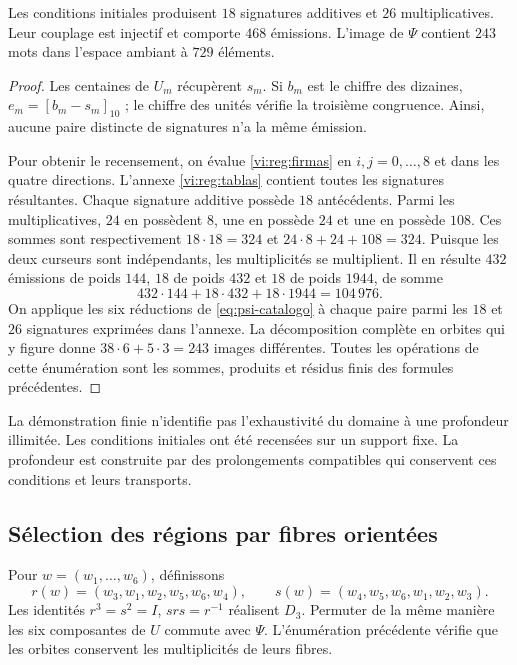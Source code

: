 \begin{proposition}
\label{vi:reg:censo}
Les conditions initiales produisent \(18\) signatures additives et \(26\)
multiplicatives. Leur couplage est injectif et comporte \(468\)
émissions. L’image de \(\Psi\) contient \(243\) mots dans
l’espace ambiant à \(729\) éléments.
\end{proposition}
\begin{proof}
Les centaines de \(U_m\) récupèrent \(s_m\). Si \(b_m\) est le
chiffre des dizaines, \(e_m=[b_m-s_m]_{10}\) ; le chiffre des unités
vérifie la troisième congruence. Ainsi, aucune paire distincte
de signatures n’a la même émission.

Pour obtenir le recensement, on évalue \eqref{vi:reg:firmas} en
\(i,j=0,\ldots,8\) et dans les quatre directions. L’annexe
\ref{vi:reg:tablas} contient toutes les signatures résultantes. Chaque
signature additive possède \(18\) antécédents. Parmi les multiplicatives,
\(24\) en possèdent \(8\), une en possède \(24\) et une en possède \(108\).
Ces sommes sont respectivement \(18\cdot18=324\) et
\(24\cdot8+24+108=324\). Puisque les deux curseurs sont
indépendants, les multiplicités se multiplient. Il en résulte
\(432\) émissions de poids \(144\), \(18\) de poids \(432\) et
\(18\) de poids \(1944\), de somme
\[
 432\cdot144+18\cdot432+18\cdot1944=104\,976.
\]
On applique les six réductions de \eqref{eq:psi-catalogo} à chaque paire
parmi les \(18\) et \(26\) signatures exprimées dans l’annexe. La
décomposition complète en orbites qui y figure donne
\(38\cdot6+5\cdot3=243\) images différentes. Toutes les
opérations de cette énumération sont les sommes, produits et résidus
finis des formules précédentes.
\end{proof}

La démonstration finie n’identifie pas l’exhaustivité du domaine à une
profondeur illimitée. Les conditions initiales ont été recensées sur
un support fixe. La profondeur est construite par des prolongements
compatibles qui conservent ces conditions et leurs transports.



\subsection{Sélection des régions par fibres orientées}

Pour \(w=(w_1,\ldots,w_6)\), définissons
\[
 r(w)=(w_3,w_1,w_2,w_5,w_6,w_4),\qquad
 s(w)=(w_4,w_5,w_6,w_1,w_2,w_3).
\]
Les identités \(r^3=s^2=I\), \(srs=r^{-1}\) réalisent
\(D_3\). Permuter de la même manière les six composantes de \(U\)
commute avec \(\Psi\). L’énumération précédente vérifie que les
orbites conservent les multiplicités de leurs fibres.

